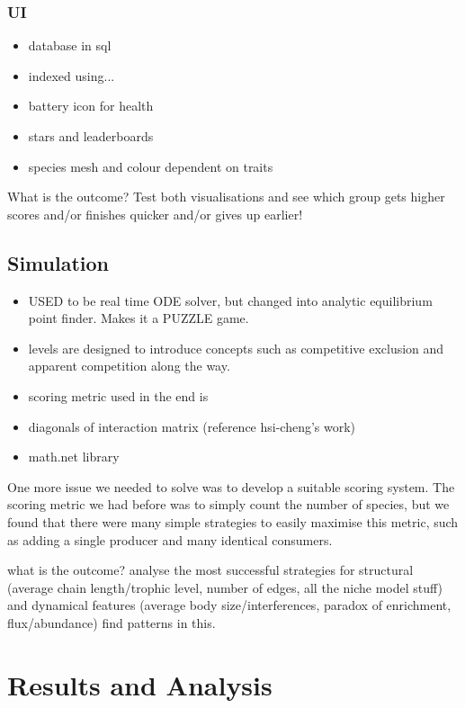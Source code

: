 \subsubsection{UI}
\begin{itemize}
  \item database in sql
  \item indexed using...
  \item battery icon for health
  \item stars and leaderboards
  \item species mesh and colour dependent on traits
\end{itemize}

What is the outcome? Test both visualisations and see which group gets higher scores and/or finishes quicker and/or gives up earlier!

\subsection{Simulation}
\begin{itemize}
  \item USED to be real time ODE solver, but changed into analytic equilibrium point finder. Makes it a PUZZLE game.
  \item levels are designed to introduce concepts such as competitive exclusion and apparent competition along the way.
  \item scoring metric used in the end is 
  \item diagonals of interaction matrix (reference hsi-cheng's work)
  \item math.net library
\end{itemize}

One more issue we needed to solve was to develop a suitable scoring system.
The scoring metric we had before was to simply count the number of species, but we found that there were many simple strategies to easily maximise this metric, such as adding a single producer and many identical consumers.


what is the outcome? analyse the most successful strategies for structural (average chain length/trophic level, number of edges, all the niche model stuff) and dynamical features (average body size/interferences, paradox of enrichment, flux/abundance)
find patterns in this.

\section{Results and Analysis}

